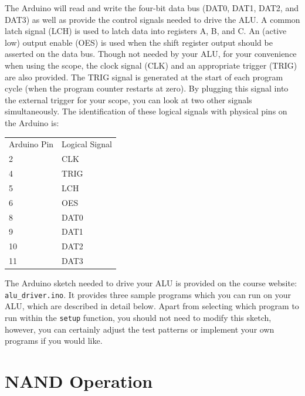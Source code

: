 \documentclass[12pt]{article}
\begin{document}
The Arduino will read and write the four-bit data bus (DAT0, DAT1, DAT2, and DAT3) as well as provide the control signals needed to drive the ALU.  A common latch signal (LCH) is used to latch data into registers A, B, and C.  An (active low) output enable (OES) is used when the shift register output should be asserted on the data bus.  Though not needed by your ALU, for your convenience when using the scope, the clock signal (CLK) and an appropriate trigger (TRIG) are also provided.  The TRIG signal is generated at the start of each program cycle (when the program counter restarts at zero).  By plugging this signal into the external trigger for your scope, you can look at two other signals simultaneously.
The identification of these logical signals with physical pins on the Arduino is:\\
\begin{center}
\begin{tabular}{ll}
Arduino Pin & Logical Signal \\
2 & CLK \\
4 & TRIG \\
5 & LCH \\
6 & OES \\
8 & DAT0 \\
9 & DAT1 \\
10 & DAT2 \\
11 & DAT3 \\
\end{tabular}
\end{center}
 
The Arduino sketch needed to drive your ALU is provided on the course website:  {\tt alu\_driver.ino}.   It provides three sample programs which you can run on your ALU, which are described in detail below.   Apart from selecting which program to run within the {\tt setup} function, you should not need to modify this sketch, however, you can certainly adjust the test patterns or implement your own programs if you would like.
 
\section{NAND Operation}

\end{document}
